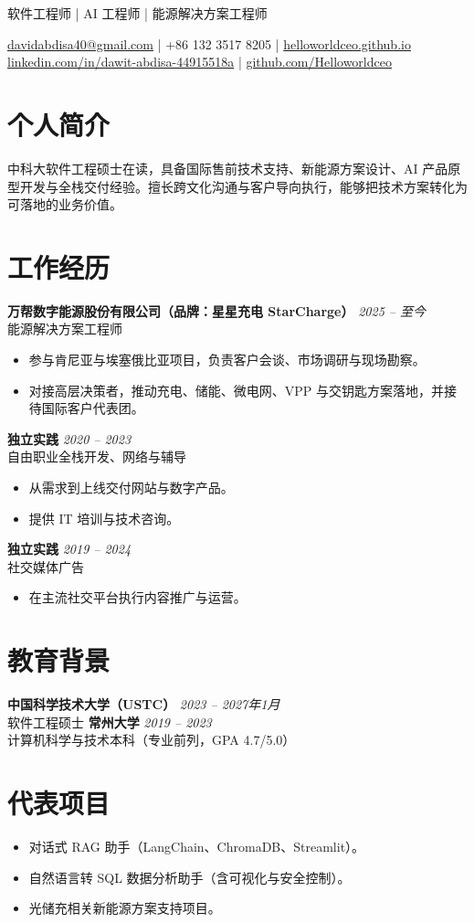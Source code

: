 \documentclass[9pt,a4paper]{article}
\newcommand{\cvsubtitle}[1]{{\normalsize\color{textgray}#1}}
\newcommand{\entry}[3]{\textbf{#1} \hfill \textit{#2}\\#3\vspace{0.1em}}
\begin{document}
\cvsubtitle{软件工程师 | AI 工程师 | 能源解决方案工程师}

\href{mailto:davidabdisa40@gmail.com}{davidabdisa40@gmail.com} \;|\; +86 132 3517 8205 \;|\;
\href{https://helloworldceo.github.io}{helloworldceo.github.io}\\
\href{https://linkedin.com/in/dawit-abdisa-44915518a}{linkedin.com/in/dawit-abdisa-44915518a} \;|\;
\href{https://github.com/Helloworldceo}{github.com/Helloworldceo}

\section*{个人简介}
中科大软件工程硕士在读，具备国际售前技术支持、新能源方案设计、AI 产品原型开发与全栈交付经验。擅长跨文化沟通与客户导向执行，能够把技术方案转化为可落地的业务价值。

\section*{工作经历}
\entry{万帮数字能源股份有限公司（品牌：星星充电 StarCharge）}{2025 -- 至今}{能源解决方案工程师}
\begin{itemize}
  \item 参与肯尼亚与埃塞俄比亚项目，负责客户会谈、市场调研与现场勘察。
  \item 对接高层决策者，推动充电、储能、微电网、VPP 与交钥匙方案落地，并接待国际客户代表团。
\end{itemize}

\entry{独立实践}{2020 -- 2023}{自由职业全栈开发、网络与辅导}
\begin{itemize}
  \item 从需求到上线交付网站与数字产品。
  \item 提供 IT 培训与技术咨询。
\end{itemize}

\entry{独立实践}{2019 -- 2024}{社交媒体广告}
\begin{itemize}
  \item 在主流社交平台执行内容推广与运营。
\end{itemize}

\section*{教育背景}
\entry{中国科学技术大学（USTC）}{2023 -- 2027年1月}{软件工程硕士}
\entry{常州大学}{2019 -- 2023}{计算机科学与技术本科（专业前列，GPA 4.7/5.0）}

\section*{代表项目}
\begin{itemize}
  \item 对话式 RAG 助手（LangChain、ChromaDB、Streamlit）。
  \item 自然语言转 SQL 数据分析助手（含可视化与安全控制）。
  \item 光储充相关新能源方案支持项目。
\end{itemize}
\end{document}
